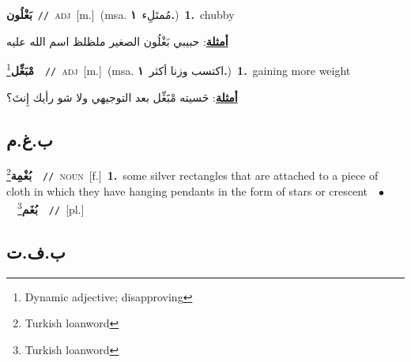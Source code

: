 \documentclass[10pt,a4paper,twoside]{article} %
\begin{document}
\begin{multicols}{2}
{\setlength\topsep{0pt}\textbf{\foreignlanguage{arabic}{بَغْلُون}}\ {\color{gray}\texttt{//}\color{black}}\ \textsc{adj}\ [m.]\ \color{gray}(msa. \foreignlanguage{arabic}{مُمتَلِء}~\foreignlanguage{arabic}{\textbf{١.}})\color{black}\ \textbf{1.}~chubby\  \begin{flushright}\color{gray}\foreignlanguage{arabic}{\textbf{\underline{\foreignlanguage{arabic}{أمثلة}}}: حبيبي بَغْلُون الصغير ملظلظ اسم الله عليه}\end{flushright}\color{black}} \vspace{2mm}

{\setlength\topsep{0pt}\textbf{\foreignlanguage{arabic}{مْبَغِّل}}\footnote{Dynamic adjective; disapproving}\ \ {\color{gray}\texttt{//}\color{black}}\ \textsc{adj}\ [m.]\ \color{gray}(msa. \foreignlanguage{arabic}{اكتسب وزنا أكثر}~\foreignlanguage{arabic}{\textbf{١.}})\color{black}\ \textbf{1.}~gaining more weight\  \begin{flushright}\color{gray}\foreignlanguage{arabic}{\textbf{\underline{\foreignlanguage{arabic}{أمثلة}}}: حَسيته مْبََغِّل بعد التوجيهي ولا شو رأيك إِنتَ؟}\end{flushright}\color{black}} \vspace{2mm}

\vspace{-3mm}
\subsection*{\color{blue}\foreignlanguage{arabic}{ب.غ.م}\color{blue}{ (ntws)}} 

{\setlength\topsep{0pt}\textbf{\foreignlanguage{arabic}{بُغْمِة}}\footnote{Turkish loanword}\ \ {\color{gray}\texttt{//}\color{black}}\ \textsc{noun}\ [f.]\ \textbf{1.}~some silver rectangles that are attached to a piece of cloth in which they have hanging pendants in the form of stars or crescent\ \ $\bullet$\ \ \setlength\topsep{0pt}\textbf{\foreignlanguage{arabic}{بُغَم}}\footnote{Turkish loanword}\ \ {\color{gray}\texttt{//}\color{black}}\ [pl.]\ } \vspace{2mm}

\vspace{-3mm}
\subsection*{\color{blue}\foreignlanguage{arabic}{ب.ف.ت}\color{blue}{}} 


\end{multicols}
\end{document}
